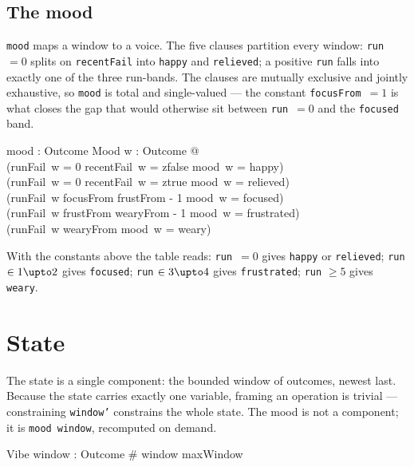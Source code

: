 \documentclass[a4paper,10pt,fleqn]{article}
\begin{document}
\subsection{The mood}

\texttt{mood} maps a window to a voice. The five clauses partition every window:
\texttt{run}~$=0$ splits on \texttt{recentFail} into \texttt{happy} and
\texttt{relieved}; a positive \texttt{run} falls into exactly one of the three
run-bands. The clauses are mutually exclusive and jointly exhaustive, so
\texttt{mood} is total and single-valued --- the constant \texttt{focusFrom}~$=1$
is what closes the gap that would otherwise sit between \texttt{run}~$=0$ and the
\texttt{focused} band.

\begin{axdef}
  mood : \seq Outcome \fun Mood
\where
  \forall w : \seq Outcome @ \\
  \quad (runFail~w = 0 \land recentFail~w = zfalse \implies mood~w = happy) \land \\
  \quad (runFail~w = 0 \land recentFail~w = ztrue \implies mood~w = relieved) \land \\
  \quad (runFail~w \in focusFrom \upto frustFrom - 1 \implies mood~w = focused) \land \\
  \quad (runFail~w \in frustFrom \upto wearyFrom - 1 \implies mood~w = frustrated) \land \\
  \quad (runFail~w \geq wearyFrom \implies mood~w = weary)
\end{axdef}

With the constants above the table reads: \texttt{run}~$=0$ gives \texttt{happy}
or \texttt{relieved}; \texttt{run} $\in 1 \upto 2$ gives \texttt{focused};
\texttt{run} $\in 3 \upto 4$ gives \texttt{frustrated}; \texttt{run} $\geq 5$
gives \texttt{weary}.

\section{State}

The state is a single component: the bounded window of outcomes, newest last.
Because the state carries exactly one variable, framing an operation is trivial
--- constraining \texttt{window'} constrains the whole state. The mood is not a
component; it is \texttt{mood}~\texttt{window}, recomputed on demand.

\begin{schema}{Vibe}
  window : \seq Outcome
\where
  \# window \leq maxWindow
\end{schema}
\end{document}
